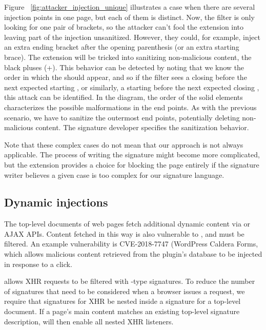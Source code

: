 Figure ~\ref{fig:attacker_injection_unique} illustrates a case when
there are several injection points in one page, but each of them is
distinct. Now, the filter is only looking for one pair of brackets, so
the attacker can't fool the extension into leaving part of the
injection unsanitized. However, they could, for example, inject an
extra ending bracket after the opening parenthesis (or an extra
starting brace). The extension will be tricked into sanitizing
non-malicious content, the black pluses (+). This behavior can be
detected by noting that we know the order in which the
 should appear, and so if the filter sees a closing
 before the next expected starting , or
similarly, a starting  before the next expected closing
, this attack can be identified. In the diagram, the
order of the solid elements characterizes the possible malformations
in the end points. As with the previous scenario, we have to sanitize
the outermost end points, potentially deleting non-malicious
content. The signature developer specifies the sanitization behavior.

Note that these complex cases do not mean that our approach is not always applicable. The process of writing the signature might become more complicated, but the extension provides a choice for blocking the page entirely if the signature writer believes a given case is too complex for our signature language.

\subsection{Dynamic injections} \label{dynamic_injections}

The top-level documents of web pages fetch additional dynamic content
via  or AJAX APIs. Content fetched in
this way is also vulnerable to \xss, and must be filtered. An example
vulnerability is CVE-2018-7747 (WordPress Caldera Forms, which allows malicious
content retrieved from the plugin's database to be injected in response to a click.

\sys allows XHR requests to be filtered with -type
signatures. To reduce the number of signatures that need to be
considered when a browser issues a request, we require that signatures
for XHR be nested inside a signature for a top-level document. If a
page's main content matches an existing top-level signature description,
\sys will then enable all nested XHR listeners.

